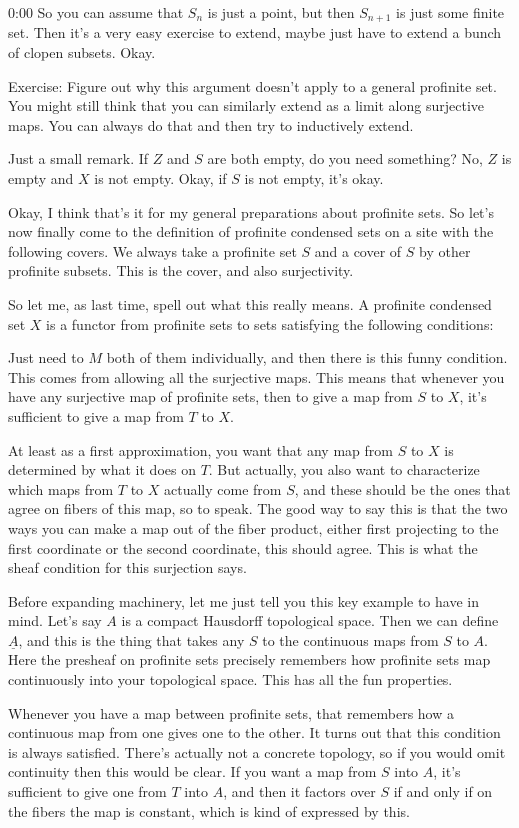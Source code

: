 \begin{unfinished}{0:00}
So you can assume that $S_n$ is just a point, but then $S_{n+1}$ is just some finite set. Then it's a very easy exercise to extend, maybe just have to extend a bunch of clopen subsets. Okay.

Exercise: Figure out why this argument doesn't apply to a general profinite set. You might still think that you can similarly extend as a limit along surjective maps. You can always do that and then try to inductively extend.

Just a small remark. If $Z$ and $S$ are both empty, do you need something? No, $Z$ is empty and $X$ is not empty. Okay, if $S$ is not empty, it's okay.

Okay, I think that's it for my general preparations about profinite sets. So let's now finally come to the definition of profinite condensed sets on a site with the following covers. We always take a profinite set $S$ and a cover of $S$ by other profinite subsets. This is the cover, and also surjectivity.

So let me, as last time, spell out what this really means. A profinite condensed set $X$ is a functor from profinite sets to sets satisfying the following conditions:

Just need to $M$ both of them individually, and then there is this funny condition. This comes from allowing all the surjective maps. This means that whenever you have any surjective map of profinite sets, then to give a map from $S$ to $X$, it's sufficient to give a map from $T$ to $X$. 

At least as a first approximation, you want that any map from $S$ to $X$ is determined by what it does on $T$. But actually, you also want to characterize which maps from $T$ to $X$ actually come from $S$, and these should be the ones that agree on fibers of this map, so to speak. The good way to say this is that the two ways you can make a map out of the fiber product, either first projecting to the first coordinate or the second coordinate, this should agree. This is what the sheaf condition for this surjection says.

Before expanding machinery, let me just tell you this key example to have in mind. Let's say $A$ is a compact Hausdorff topological space. Then we can define $\underline{A}$, and this is the thing that takes any $S$ to the continuous maps from $S$ to $A$. Here the presheaf on profinite sets precisely remembers how profinite sets map continuously into your topological space. This has all the fun properties.

Whenever you have a map between profinite sets, that remembers how a continuous map from one gives one to the other. It turns out that this condition is always satisfied. There's actually not a concrete topology, so if you would omit continuity then this would be clear. If you want a map from $S$ into $A$, it's sufficient to give one from $T$ into $A$, and then it factors over $S$ if and only if on the fibers the map is constant, which is kind of expressed by this.


\end{unfinished}
